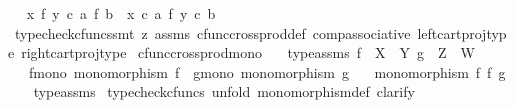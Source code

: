 \begin{isabellebody}
\ \isamarkupfalse%
\ {\isachardoublequoteopen}{\isacharparenleft}{\kern0pt}x\ {\isasymtimes}\isactrlsub f\ y{\isacharparenright}{\kern0pt}\ {\isasymcirc}\isactrlsub c\ a\ {\isasymtimes}\isactrlsub f\ b\ {\isacharequal}{\kern0pt}\ {\isacharparenleft}{\kern0pt}x\ {\isasymcirc}\isactrlsub c\ a{\isacharparenright}{\kern0pt}\ {\isasymtimes}\isactrlsub f\ y\ {\isasymcirc}\isactrlsub c\ b{\isachardoublequoteclose}\isanewline
\ \ \ \ \isamarkupfalse%
\ {\isacharparenleft}{\kern0pt}typecheck{\isacharunderscore}{\kern0pt}cfuncs{\isacharcomma}{\kern0pt}smt\ {\isacharparenleft}{\kern0pt}z{}{\isacharparenright}{\kern0pt}\ assms\ cfunc{\isacharunderscore}{\kern0pt}cross{\isacharunderscore}{\kern0pt}prod{\isacharunderscore}{\kern0pt}def{}\ comp{\isacharunderscore}{\kern0pt}associative{}\ left{\isacharunderscore}{\kern0pt}cart{\isacharunderscore}{\kern0pt}proj{\isacharunderscore}{\kern0pt}type\ right{\isacharunderscore}{\kern0pt}cart{\isacharunderscore}{\kern0pt}proj{\isacharunderscore}{\kern0pt}type{\isacharparenright}{\kern0pt}\isanewline
{}\isamarkupfalse%
%
\endisatagproof
{\isafoldproof}%
%
\isadelimproof
\isanewline
%
\endisadelimproof
\isanewline
{}\isamarkupfalse%
\ cfunc{\isacharunderscore}{\kern0pt}cross{\isacharunderscore}{\kern0pt}prod{\isacharunderscore}{\kern0pt}mono{\isacharcolon}{\kern0pt}\isanewline
\ \ \ type{\isacharunderscore}{\kern0pt}assms{\isacharcolon}{\kern0pt}\ {\isachardoublequoteopen}f\ {\isacharcolon}{\kern0pt}\ X\ {\isasymrightarrow}\ Y{\isachardoublequoteclose}\ {\isachardoublequoteopen}g\ {\isacharcolon}{\kern0pt}\ Z\ {\isasymrightarrow}\ W{\isachardoublequoteclose}\isanewline
\ \ \ f{\isacharunderscore}{\kern0pt}mono{\isacharcolon}{\kern0pt}\ {\isachardoublequoteopen}monomorphism\ f{\isachardoublequoteclose}\ \ g{\isacharunderscore}{\kern0pt}mono{\isacharcolon}{\kern0pt}\ {\isachardoublequoteopen}monomorphism\ g{\isachardoublequoteclose}\isanewline
\ \ \ {\isachardoublequoteopen}monomorphism\ {\isacharparenleft}{\kern0pt}f\ {\isasymtimes}\isactrlsub f\ g{\isacharparenright}{\kern0pt}{\isachardoublequoteclose}\isanewline
%
\isadelimproof
\ \ %
\endisadelimproof
%
\isatagproof
{}\isamarkupfalse%
\ type{\isacharunderscore}{\kern0pt}assms\isanewline
{}\isamarkupfalse%
\ {\isacharparenleft}{\kern0pt}typecheck{\isacharunderscore}{\kern0pt}cfuncs{\isacharcomma}{\kern0pt}\ unfold\ monomorphism{\isacharunderscore}{\kern0pt}def{}{\isacharcomma}{\kern0pt}\ clarify{\isacharparenright}{\kern0pt}\isanewline

\end{isabellebody}
